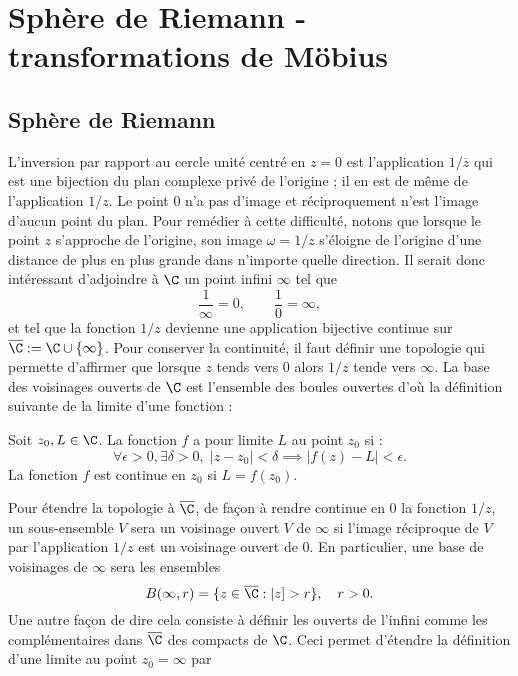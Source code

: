  
\section{Sphère de Riemann - transformations de Möbius} 

\subsection{Sphère de Riemann}

L'inversion par rapport au cercle unité centré en $z=0$ est l'application $1/\overline{z}$ qui est une bijection du plan complexe privé de l'origine ; il en est de même de l'application $1/z$. Le point $0$ n'a pas d'image et réciproquement n'est l'image d'aucun point du plan. Pour remédier à cette difficulté, notons que lorsque le point $z$ s'approche de l'origine, son image $\omega=1/z$ s'éloigne de l'origine d'une distance de plus en plus grande dans n'importe quelle direction. Il serait donc intéressant d'adjoindre à $\C$ un point infini $\infty$ tel que 
\[\frac{1}{\infty}=0, \qquad \frac{1}{0}=\infty,\]
et tel que la fonction $1/z$ devienne une application bijective continue sur $\overline{\C}:= \C \cup \{\infty\}$. Pour conserver la continuité, il faut définir une topologie qui permette d'affirmer que lorsque $z$ tends vers $0$ alors $1/z$ tende vers $\infty$. La base des voisinages ouverts de $\C$ est l'ensemble des boules ouvertes d'où la définition suivante de la limite d'une fonction :
\begin{fdefn}
Soit $z_0, L\in \C$. La fonction $f$ a pour limite $L$ au point $z_0$ si : 
\[\forall \epsilon >0, \exists \delta >0, \;  \lvert z-z_0 \rvert < \delta \implies \lvert f(z)-L \rvert < \epsilon.\]
La fonction $f$ est continue en $z_0$ si $L=f(z_0)$.
\end{fdefn}

Pour étendre la topologie à $\overline{\C}$, de façon à rendre continue en $0$ la fonction $1/z$, un sous-ensemble $V$ sera un voisinage ouvert $V$ de $\infty$ si l'image réciproque de $V$ par l'application $1/z$ est un voisinage ouvert de $0$. En particulier, une base de voisinages de $\infty$ sera les ensembles
\[ B(\infty, r)=\{z  \in \overline{\C} : |z]>r\}, \quad r>0.\]
Une autre façon de dire cela consiste à définir les ouverts de l'infini comme les complémentaires dans $\overline{\C}$ des compacts de $\C$. Ceci permet d'étendre la définition d'une limite au point $z_0 = \infty$ par

